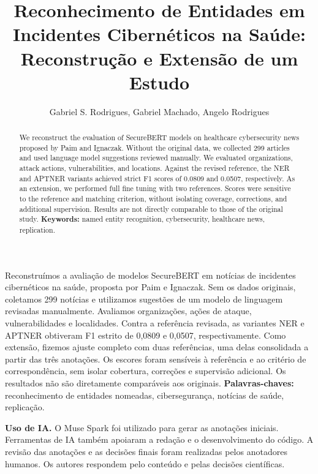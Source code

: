 \documentclass[12pt]{article}
\title{Reconhecimento de Entidades em Incidentes Cibernéticos na Saúde: Reconstrução e Extensão de um Estudo}
\author{Gabriel S. Rodrigues\inst{1}, Gabriel Machado\inst{1}, Angelo Rodrigues\inst{1}
}
\begin{document}
\maketitle

\begin{resumo}
  \normalfont
  Reconstruímos a avaliação de modelos SecureBERT em notícias de incidentes cibernéticos na saúde, proposta por Paim e Ignaczak. Sem os dados originais, coletamos 299 notícias e utilizamos sugestões de um modelo de linguagem revisadas manualmente. Avaliamos organizações, ações de ataque, vulnerabilidades e localidades. Contra a referência revisada, as variantes NER e APTNER obtiveram F1 estrito de 0,0809 e 0,0507, respectivamente. Como extensão, fizemos ajuste completo com duas referências, uma delas consolidada a partir das três anotações. Os escores foram sensíveis à referência e ao critério de correspondência, sem isolar cobertura, correções e supervisão adicional. Os resultados não são diretamente comparáveis aos originais.
  \textbf{Palavras-chaves:} reconhecimento de entidades nomeadas, cibersegurança, notícias de saúde, replicação.
\end{resumo}

\begin{abstract}
  \normalfont
  We reconstruct the evaluation of SecureBERT models on healthcare cybersecurity news proposed by Paim and Ignaczak. Without the original data, we collected 299 articles and used language model suggestions reviewed manually. We evaluated organizations, attack actions, vulnerabilities, and locations. Against the revised reference, the NER and APTNER variants achieved strict F1 scores of 0.0809 and 0.0507, respectively. As an extension, we performed full fine tuning with two references. Scores were sensitive to the reference and matching criterion, without isolating coverage, corrections, and additional supervision. Results are not directly comparable to those of the original study.
  \textbf{Keywords:} named entity recognition, cybersecurity, healthcare news, replication.
\end{abstract}






{\normalsize
\vspace{4pt}
\noindent\textbf{Uso de IA.} O Muse Spark foi utilizado para gerar as anotações iniciais. Ferramentas de IA também apoiaram a redação e o desenvolvimento do código. A revisão das anotações e as decisões finais foram realizadas pelos anotadores humanos. Os autores respondem pelo conteúdo e pelas decisões científicas.



}
\end{document}
